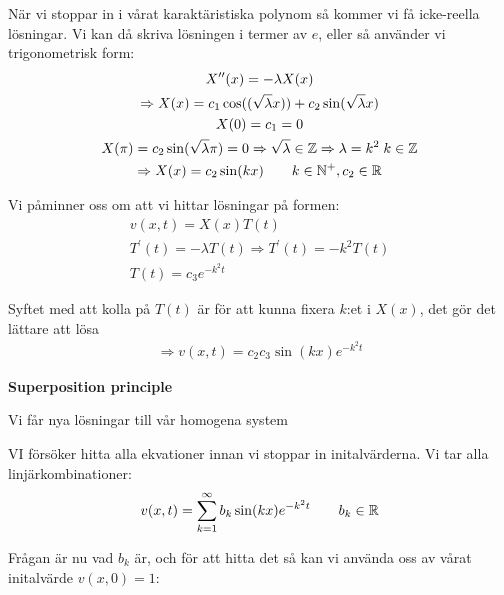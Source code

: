 \noindent När vi stoppar in i vårat karaktäristiska polynom så kommer vi få icke-reella lösningar. Vi kan då skriva lösningen i termer av $e$, eller så använder vi trigonometrisk form: 
\begin{equation*}
  \begin{gathered}
    X^{\prime\prime}(x) = -\lambda X(x)\\
    \Rightarrow X(x) = c_1\cos((\sqrt{\lambda}x))+c_2\sin(\sqrt{\lambda}x)\\
    X(0) = c_1 = 0\\
    X(\pi) = c_2\sin(\sqrt{\lambda}\pi) = 0\Rightarrow\sqrt{\lambda}\in\mathbb{Z}\Rightarrow \lambda = k^2\;k\in\mathbb{Z}\\
    \Rightarrow X(x) = c_2\sin(kx)\qquad k\in\mathbb{N}^+, c_2\in\mathbb{R}
  \end{gathered}
\end{equation*}
\par\bigskip
\noindent Vi påminner oss om att vi hittar lösningar på formen:
\begin{equation*}
  \begin{gathered}
    v(x,t) = X(x)T(t)\\
    T^{\prime}(t) = -\lambda T(t)\Rightarrow T^{\prime}(t) = -k^2 T(t)\\
    T(t) = c_3e^{-k^2t}
  \end{gathered}
\end{equation*}\par
\noindent Syftet med att kolla på $T(t)$ är för att kunna fixera $k$:et i $X(x)$, det gör det lättare att lösa
\begin{equation*}
  \begin{gathered}
    \Rightarrow v(x,t) = c_2c_3\sin(kx)e^{-k^2t}
  \end{gathered}
\end{equation*}
\par\bigskip
\noindent\textbf{Superposition principle}\par
\noindent Vi får nya lösningar till vår homogena system\par
\noindent VI försöker hitta alla ekvationer innan vi stoppar in initalvärderna. Vi tar alla linjärkombinationer:
\begin{equation*}
  \begin{gathered}
    v(x,t) = \sum_{k=1}^{\infty} b_k\sin(kx)e^{-k^2t}\qquad b_k\in\mathbb{R}
  \end{gathered}
\end{equation*}
\par\bigskip
\noindent Frågan är nu vad $b_k$ är, och för att hitta det så kan vi använda oss av vårat initalvärde $v(x,0) = 1$:
